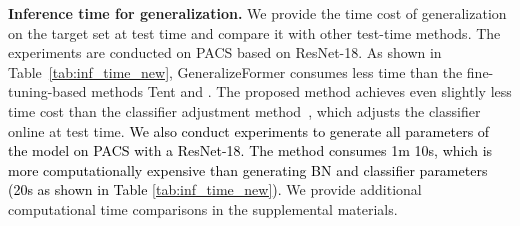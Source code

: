  

















\noindent
\textbf{Inference time for generalization.} 
We provide the time cost of generalization on the target set at test time and compare it with other test-time methods.
The experiments are conducted on PACS based on ResNet-18.
As shown in Table~\ref{tab:inf_time_new}, GeneralizeFormer consumes less time than the fine-tuning-based methods Tent and \cite{liang2020we}. %
The proposed method achieves even slightly less time cost than the classifier adjustment method~\cite{iwasawa2021test}, which adjusts the classifier online at test time. 
\textcolor{black}{We also conduct experiments to generate all parameters of the model on PACS with a ResNet-18.  The method consumes 1m 10s, which is more computationally expensive than generating BN and classifier parameters (20s as shown in Table \ref{tab:inf_time_new}).}
We provide additional computational time comparisons in the supplemental materials.
